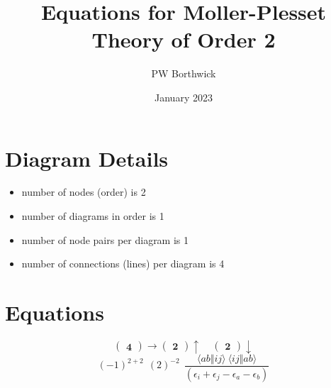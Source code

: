 \documentclass[12pt,oneside,a4paper,fleqn]{article}
\begin{document}
\title{Equations for Moller-Plesset Theory of Order 2}
\author{PW Borthwick}
\date{January 2023}
\maketitle

\section{Diagram Details}
\begin{itemize}
\item number of nodes (order) is 2
\item number of diagrams in order is 1
\item number of node pairs per diagram is 1
\item number of connections (lines) per diagram is 4
\end{itemize}

\section{Equations}
\normalsize

\[ \boldsymbol{ \begin{pmatrix} 4 \end{pmatrix} \rightarrow \begin{pmatrix} 2 \end{pmatrix} \uparrow~~~~~\begin{pmatrix} 2 \end{pmatrix} \downarrow } \]
$$(-1)^{2+2}~~(2)^{-2}~~\frac{\langle ab \Vert ij \rangle ~\langle ij \Vert ab \rangle }{(\epsilon_i +\epsilon_j -\epsilon_a -\epsilon_b ) }$$
\end{document}
